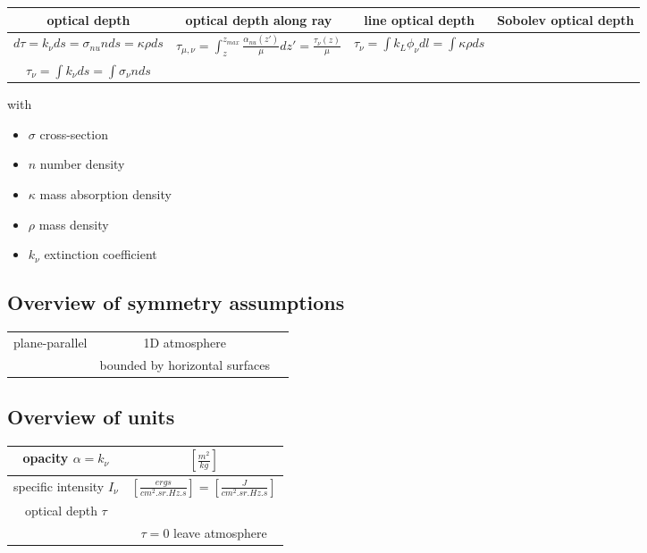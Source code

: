 \documentclass[../main/main.tex]{subfiles}
\begin{document}
\begin{center}
\hspace*{-2cm}
\centering
{\tabulinesep=1.5mm
\begin{tabu}{|c|c|c|c|}
\hline 
optical depth 
	& optical depth along ray 
	& line optical depth 
	& Sobolev optical depth \\ \hline
$d\tau = k_{\nu}ds = \sigma_{nu}n ds = \kappa \rho ds$ 
	& $\tau_{\mu,\nu} = \int_z^{z_{max}} \frac{\alpha_{nu}(z')}{\mu}dz' = \frac{\tau_{\nu}(z)}{\mu}$ 
	& $\tau_{\nu} = \int k_L \phi_{\nu} dl = \int \kappa \rho ds$ \\ 
$\tau_{\nu} = \int k_{\nu}ds = \int \sigma_{\nu} n ds$ & \\ \hline
\end{tabu}}
\end{center}
with \begin{itemize}
\item $\sigma$ cross-section
\item $n$ number density
\item $\kappa$ mass absorption density
\item $\rho$ mass density
\item $k_{\nu}$ extinction coefficient
\end{itemize}


\subsection{Overview of symmetry assumptions}
\begin{center}
\centering
{\tabulinesep=1.5mm
\begin{tabu}{|c|c|c|}
\hline 
plane-parallel & 1D atmosphere & \\ 
& bounded by horizontal surfaces & \\ \hline
\end{tabu}}
\end{center}


\subsection{Overview of units}
\begin{center}
\centering
{\tabulinesep=1.5mm
\begin{tabu}{|c|c|}
\hline 
opacity $\alpha = k_{\nu}$ & $\left[ \frac{m^2}{kg} \right] $ \\ \hline

specific intensity $I_{\nu}$ & $\left[ \frac{ergs}{cm^2 . sr . Hz . s} \right] = \left[ \frac{J}{cm^2 . sr . Hz . s} \right] $ \\ \hline

optical depth $\tau$ & \\ 
& $\boxed{\tau = 0}$ leave atmosphere \\ \hline

\end{tabu}}
\end{center}
\end{document}
